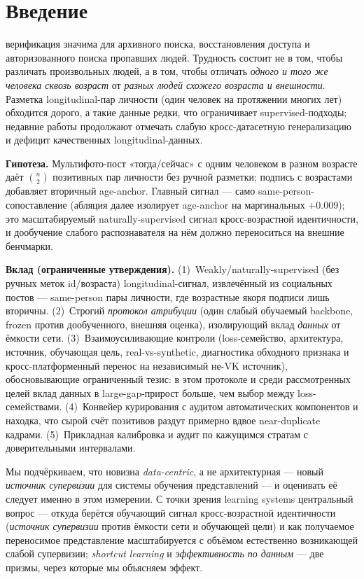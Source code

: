 \documentclass[journal]{IEEEtran}
\begin{document}
\section{Введение}\label{sec:intro}
 верификация значима для архивного поиска, восстановления доступа и авторизованного поиска пропавших людей. Трудность состоит не в том, чтобы различать произвольных людей, а в том, чтобы отличать \emph{одного и того же человека сквозь возраст} от \emph{разных людей схожего возраста и внешности}. Разметка longitudinal-пар личности (один человек на протяжении многих лет) обходится дорого, а такие данные редки, что ограничивает supervised-подходы; недавние работы продолжают отмечать слабую кросс-датасетную генерализацию и дефицит качественных longitudinal-данных.

\textbf{Гипотеза.} Мультифото-пост «тогда/сейчас» с одним человеком в разном возрасте даёт $\binom{n}{2}$ позитивных пар личности без ручной разметки; подпись с возрастами добавляет вторичный age-anchor. Главный сигнал --- само same-person-сопоставление (абляция далее изолирует age-anchor на маргинальных $+$0.009); это масштабируемый naturally-supervised сигнал кросс-возрастной идентичности, и дообучение слабого распознавателя на нём должно переноситься на внешние бенчмарки.

\textbf{Вклад (ограниченные утверждения).}
(1)~Weakly/naturally-supervised (без ручных меток id/возраста) longitudinal-сигнал, извлечённый из социальных постов --- same-person пары личности, где возрастные якоря подписи лишь вторичны.
(2)~Строгий \emph{протокол атрибуции} (один слабый обучаемый backbone, frozen против дообученного, внешняя оценка), изолирующий вклад \emph{данных} от ёмкости сети.
(3)~Взаимоусиливающие контроли (loss-семейство, архитектура, источник, обучающая цель, real-vs-synthetic, диагностика обходного признака и кросс-платформенный перенос на независимый не-VK источник), обосновывающие ограниченный тезис: в этом протоколе и среди рассмотренных целей вклад данных в large-gap-прирост больше, чем выбор между loss-семействами.
(4)~Конвейер курирования с аудитом автоматических компонентов и находка, что сырой счёт позитивов раздут примерно вдвое near-duplicate кадрами.
(5)~Прикладная калибровка и аудит по кажущимся стратам с доверительными интервалами.

Мы подчёркиваем, что новизна \emph{data-centric}, а не архитектурная --- новый \emph{источник супервизии} для системы обучения представлений --- и оценивать её следует именно в этом измерении. С точки зрения learning systems центральный вопрос --- откуда берётся обучающий сигнал кросс-возрастной идентичности (\emph{источник супервизии} против ёмкости сети и обучающей цели) и как получаемое переносимое представление масштабируется с объёмом естественно возникающей слабой супервизии; \emph{shortcut learning} и \emph{эффективность по данным} --- две призмы, через которые мы объясняем эффект.
\end{document}
